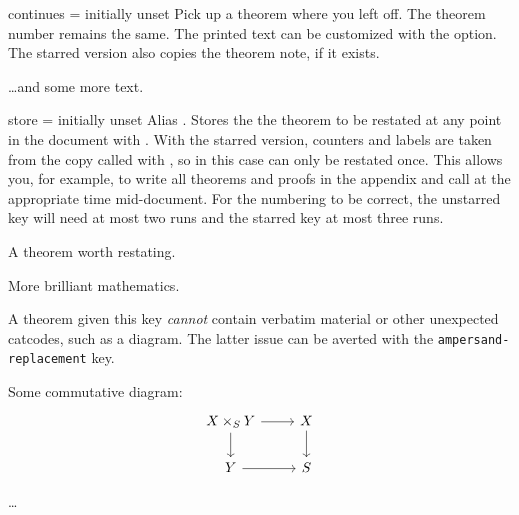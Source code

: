 \documentclass{ltxdoc}
\begin{document}
\begin{docKey}{continues}
  {\sarg=}
  {initially unset}
Pick up a theorem where you left off.
The theorem number remains the same.
The printed text can be customized with the  option.
The starred version also copies the theorem note, if it exists.

\begin{keythmscode}[]
\begin{theorem}[continues=foo]
\dots and some more text.
\end{theorem}
\end{keythmscode}

\end{docKey}

\begin{docKey}{store}
  {\sarg=}
  {initially unset}
Alias \sarg.
Stores the the theorem to be restated at any point in the document with .
With the starred version, counters and labels are taken from the copy called with , so in this case can only be restated once.
This allows you, for example, to write all theorems and proofs in the appendix and call  at the appropriate time mid-document.
For the numbering to be correct, the unstarred key will need at most two runs and the starred key at most three runs.

\begin{keythmscode}[]
\begin{theorem}[store=blub]
A theorem worth restating.
\end{theorem}
More brilliant mathematics.
\end{keythmscode}

A theorem given this key \emph{cannot} contain verbatim material or other unexpected catcodes, such as a  diagram.
The latter issue can be averted with the \texttt{ampersand-replacement} key.

\begin{tcbwritetemp}
\usepackage{tikz}
\usetikzlibrary{cd}
\end{tcbwritetemp}

\begin{keythmscode}[withpreamble]
\begin{lemma}[store=diagram]
Some commutative diagram:
\[\begin{tikzcd}[ampersand replacement=\&]
X\times_S Y \ar[r] \ar[d] \& X \ar[d] \\
Y \ar[r] \& S
\end{tikzcd}\]
\end{lemma}
\dots
{}
\end{keythmscode}

\end{docKey}
\end{document}

